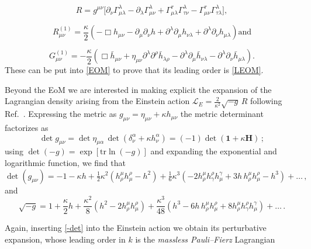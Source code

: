 \documentclass[12pt,a4paper,oneside]{article}
\numberwithin{equation}{section}   %
\begin{document}
\begin{equation}
R = g^{\mu\nu}\bigl[\partial_\nu \Gamma^\lambda_{\mu\lambda} - \partial_\lambda\Gamma^\lambda_{\mu\nu} + \Gamma^\tau_{\mu\lambda}\Gamma^\lambda_{\tau\nu} - \Gamma^\tau_{\mu\nu}\Gamma^\lambda_{\tau\lambda}\bigr],
\end{equation}

\begin{equation}
R_{\mu\nu}^{(1)} = \frac{\kappa}{2}\left( -\Box h_{\mu\nu} - \partial_\mu \partial_\nu h + \partial^\lambda \partial_\mu h_{\nu\lambda} + \partial^\lambda \partial_\nu h_{\mu\lambda} \right) \text{and}
\end{equation}

\begin{equation}
G_{\mu\nu}^{(1)} = -\frac{\kappa}{2}\left( \Box \bar{h}_{\mu\nu} + \eta_{\mu\nu} \partial^\lambda \partial^\rho \bar{h}_{\lambda\rho} - \partial^\lambda \partial_\mu \bar{h}_{\nu\lambda} - \partial^\lambda \partial_\nu \bar{h}_{\mu\lambda} \right).
\end{equation}
These can be put into \eqref{EOM} to prove that its leading order is \eqref{LEOM}.

Beyond the EoM we are interested in making explicit the expansion of
the Lagrangian density arising from the Einstein action
$\mathcal{L}_E=\frac{2}{\kappa^2}\sqrt{-g}\,R$
following Ref.~\cite{Feynman1963}.
Expressing the metric as
 $g_{\mu\nu}=\eta_{\mu\nu}+\kappa h_{\mu\nu}$ 
 the metric determinant factorizes as
\begin{equation}
\det g_{\mu\nu}
= \det\eta_{\mu\alpha}\,\det(\delta^\alpha_\nu+\kappa h^\alpha_\nu)
= (-1)\det(\mathbf{1}+\kappa\mathbf{H}) \, ;
\end{equation}
using $\det(-g)=\exp[\mathrm{tr}\ln(-g)]$ and expanding the exponential
and logarithmic function, we find that
\begin{equation}
\det(g_{\mu\nu}) = -1 - \kappa h + \tfrac12\kappa^2(h^\mu_\rho h^\rho_\mu - h^2) + \tfrac16\kappa^3(-2h^\mu_\rho h^\rho_\gamma h^\gamma_\mu + 3h\,h^\mu_\rho h^\rho_\mu - h^3)+\dots \, ,
\end{equation}
and 
\begin{equation}
\sqrt{-g} = 1 + \frac{\kappa}{2}h + \frac{\kappa^2}{8}(h^2 - 2h^\mu_\rho h^\rho_\mu) + \frac{\kappa^3}{48}(h^3 - 6h\,h^\mu_\rho h^\rho_\mu + 8h^\mu_\rho h^\rho_\gamma h^\gamma_\mu) +\dots \, .
\label{-det}
\end{equation}

Again, inserting \eqref{-det} into the Einstein action we 
obtain its perturbative expansion, whose leading order 
in $k$ is the
\textit{massless Pauli--Fierz} Lagrangian 
\end{document}
